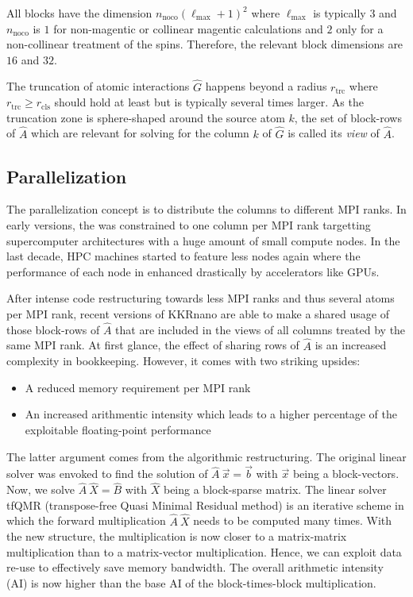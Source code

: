 \documentclass[a4paper]{article}
\newcommand{\MPIrank}{MPI rank} %
\newcommand{\um}[1]{_{\mathrm{#1}}}
\begin{document}
All blocks have the dimension $n\um{noco}(\ell\um{max} + 1)^2$
where $\ell\um{max}$ is typically $3$ and $n\um{noco}$ is $1$
for non-magentic or collinear magentic calculations 
and $2$ only for a non-collinear treatment of the spins.
Therefore, the relevant block dimensions are $16$ and $32$.

The truncation of atomic interactions $\hat G$ happens beyond a radius $r\um{trc}$
where $r\um{trc} \geq r\um{cls}$ should hold at least but is typically several times larger.
As the truncation zone is sphere-shaped around the source atom $k$, 
the set of block-rows of $\hat A$ which are relevant
for solving for the column $k$ of $\hat G$ is called its \emph{view} of $\hat A$.

\subsection{Parallelization} \label{sec:parallelization}

The parallelization concept is to distribute the columns to different \MPIrank{}s.
In early versions, the was constrained to one column per \MPIrank{} targetting supercomputer
architectures with a huge amount of small compute nodes. 
In the last decade, HPC machines started to feature less nodes again 
where the performance of each node in enhanced drastically by accelerators like GPUs.

After intense code restructuring towards less \MPIrank{}s and thus several atoms per \MPIrank{}, %
recent versions of KKRnano are able to make a shared usage of those block-rows of $\hat A$
that are included in the views of all columns treated by the same \MPIrank{}.
At first glance, the effect of sharing rows of $\hat A$ is an increased complexity
in bookkeeping. However, it comes with two striking upsides:
\begin{itemize}
 \item A reduced  memory requirement per \MPIrank{}
 \item An increased arithmentic intensity which leads to a higher percentage of the exploitable floating-point performance
\end{itemize}
The latter argument comes from the algorithmic restructuring.
The original linear solver was envoked to find the solution of 
$\hat A \ \vec x = \vec b$ with $\vec x$ being a block-vectors.
Now, we solve $\hat A \ \hat X = \hat B$ with $\hat X$ being a block-sparse matrix.
The linear solver tfQMR (transpose-free Quasi Minimal Residual method)
is an iterative scheme in which the forward multiplication $\hat A \ \hat X$
needs to be computed many times.
With the new structure, the multiplication is now closer to a matrix-matrix multiplication
than to a matrix-vector multiplication. Hence, we can exploit data re-use to effectively
save memory bandwidth. 
The overall arithmetic intensity (AI) is now higher than the base AI of the block-times-block multiplication.
\end{document}
